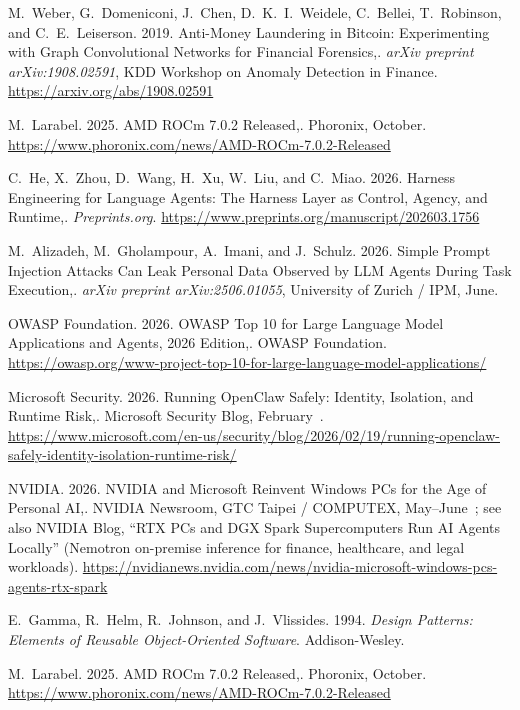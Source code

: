 {\begin{enumerate}[label={[\arabic*]}]
\item M.~Weber, G.~Domeniconi, J.~Chen, D.~K.~I.~Weidele, C.~Bellei, T.~Robinson, and C.~E.~Leiserson. 2019. Anti-Money Laundering in Bitcoin: Experimenting with Graph Convolutional Networks for Financial Forensics,. \emph{arXiv preprint arXiv:1908.02591}, KDD Workshop on Anomaly Detection in Finance. \url{https://arxiv.org/abs/1908.02591}

\item M.~Larabel. 2025. AMD ROCm 7.0.2 Released,. Phoronix, October. \url{https://www.phoronix.com/news/AMD-ROCm-7.0.2-Released}

\item C.~He, X.~Zhou, D.~Wang, H.~Xu, W.~Liu, and C.~Miao. 2026. Harness Engineering for Language Agents: The Harness Layer as Control, Agency, and Runtime,. \emph{Preprints.org}. \url{https://www.preprints.org/manuscript/202603.1756}

\item M.~Alizadeh, M.~Gholampour, A.~Imani, and J.~Schulz. 2026. Simple Prompt Injection Attacks Can Leak Personal Data Observed by LLM Agents During Task Execution,. \emph{arXiv preprint arXiv:2506.01055}, University of Zurich / IPM, June.

\item OWASP Foundation. 2026. OWASP Top 10 for Large Language Model Applications and Agents, 2026 Edition,. OWASP Foundation. \url{https://owasp.org/www-project-top-10-for-large-language-model-applications/}

\item Microsoft Security. 2026. Running OpenClaw Safely: Identity, Isolation, and Runtime Risk,. Microsoft Security Blog, February~. \url{https://www.microsoft.com/en-us/security/blog/2026/02/19/running-openclaw-safely-identity-isolation-runtime-risk/}

\item NVIDIA. 2026. NVIDIA and Microsoft Reinvent Windows PCs for the Age of Personal AI,. NVIDIA Newsroom, GTC Taipei / COMPUTEX, May--June~; see also NVIDIA Blog, ``RTX PCs and DGX Spark Supercomputers Run AI Agents Locally'' (Nemotron on-premise inference for finance, healthcare, and legal workloads). \url{https://nvidianews.nvidia.com/news/nvidia-microsoft-windows-pcs-agents-rtx-spark}

\item E.~Gamma, R.~Helm, R.~Johnson, and J.~Vlissides. 1994. \emph{Design Patterns: Elements of Reusable Object-Oriented Software}. Addison-Wesley.

\item M.~Larabel. 2025. AMD ROCm 7.0.2 Released,. Phoronix, October. \url{https://www.phoronix.com/news/AMD-ROCm-7.0.2-Released}


\end{enumerate}}
